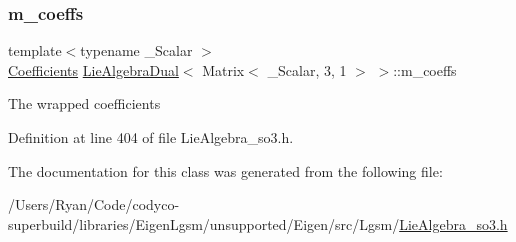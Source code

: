 \subsubsection{\texorpdfstring{m\+\_\+coeffs}{m\_coeffs}}
{\footnotesize\ttfamily template$<$typename \+\_\+\+Scalar $>$ \\
\hyperlink{class_lie_algebra_dual_3_01_matrix_3_01___scalar_00_013_00_011_01_4_01_4_ae90a3999d66fafefffe5538cd72985ee}{Coefficients} \hyperlink{class_lie_algebra_dual}{Lie\+Algebra\+Dual}$<$ Matrix$<$ \+\_\+\+Scalar, 3, 1 $>$ $>$\+::m\+\_\+coeffs\hspace{0.3cm}{\ttfamily [protected]}}

The wrapped coefficients 

Definition at line 404 of file Lie\+Algebra\+\_\+so3.\+h.



The documentation for this class was generated from the following file\+:\begin{DoxyCompactItemize}
\item 
/\+Users/\+Ryan/\+Code/codyco-\/superbuild/libraries/\+Eigen\+Lgsm/unsupported/\+Eigen/src/\+Lgsm/\hyperlink{_lie_algebra__so3_8h}{Lie\+Algebra\+\_\+so3.\+h}\end{DoxyCompactItemize}
